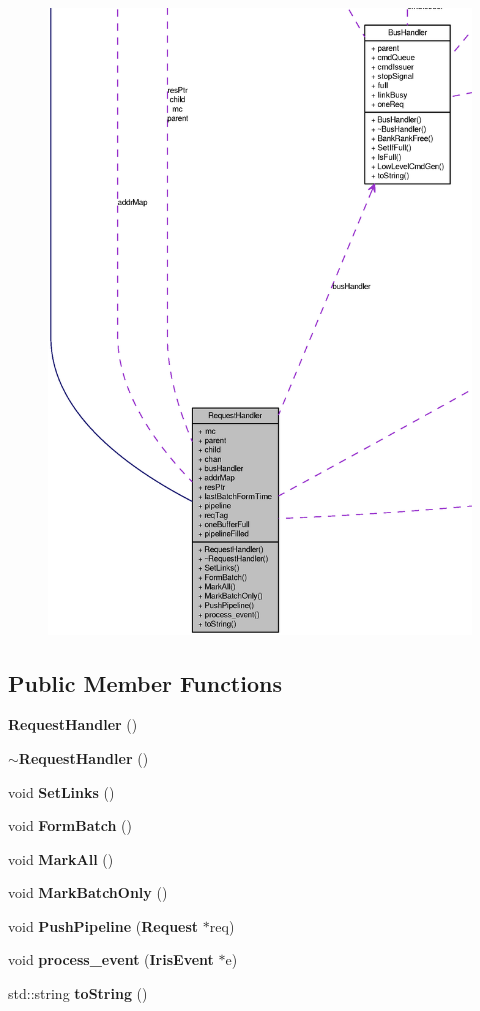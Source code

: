 \begin{figure}[H]
\begin{center}
\leavevmode
\includegraphics[width=400pt]{classRequestHandler__coll__graph}
\end{center}
\end{figure}
\subsection*{Public Member Functions}
\begin{CompactItemize}
\item 
{\bf RequestHandler} ()
\item 
{\bf $\sim$RequestHandler} ()
\item 
void {\bf SetLinks} ()
\item 
void {\bf FormBatch} ()
\item 
void {\bf MarkAll} ()
\item 
void {\bf MarkBatchOnly} ()
\item 
void {\bf PushPipeline} ({\bf Request} $\ast$req)
\item 
void {\bf process\_\-event} ({\bf IrisEvent} $\ast$e)
\item 
std::string {\bf toString} ()
\end{CompactItemize}
